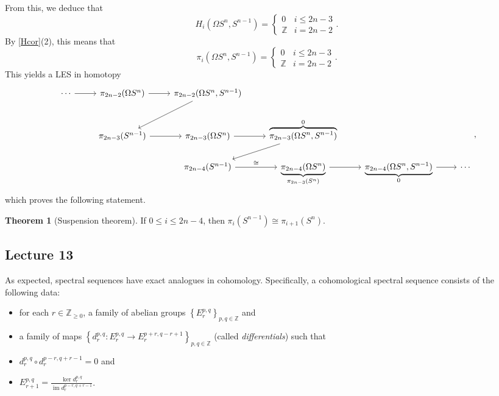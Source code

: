 \documentclass[10pt,letterpaper,cm]{nupset}
\theoremstyle{definition}
\theoremstyle{theorem}
\newtheorem{theorem}[defn]{Theorem}
\theoremstyle{remark}
\newcommand{\Z}{\mathbb Z}
\newcommand{\1}{\mathbb{1}}
\newcommand{\0}{\vec 0}
\DeclareMathOperator{\im}{im}
\newcommand{\bi}{\begin{itemize}}
\newcommand{\ei}{\end{itemize}}
\begin{document}
From this, we deduce that
\[
H_i(\Omega{S^n}, S^{n-1}) = \begin{cases} 0 & i \leq 2n-3
\\ \Z & i = 2n-2
\end{cases}.
\] By \cref{Hcor}(2), this means that
\[
\pi_i(\Omega{S^n}, S^{n-1}) = \begin{cases} 0 & i \leq 2n-3
\\ \Z & i = 2n-2
\end{cases}.
\]
This yields a LES in homotopy
\[
\begin{tikzcd}
\cdots \arrow[r] & \pi_{2n-2}(\Omega{S^n}) \arrow[r] & {\pi_{2n-2}(\Omega{S^n}, S^{n-1})} \arrow[ld] &                                                                  &                                                               &        \\
                 & \pi_{2n-3}(S^{n-1}) \arrow[r]     & \pi_{2n-3}(\Omega{S^n}) \arrow[r]             & {\overbrace{\pi_{2n-3}(\Omega{S^n}, S^{n-1})}^{0}} \arrow[ld]    &                                                               &        \\
                 &                                   & \pi_{2n-4}(S^{n-1}) \arrow[r, "\cong"]        & \underbrace{\pi_{2n-4}(\Omega{S^n})}_{\pi_{2n-3}(S^n)} \arrow[r] & {\underbrace{\pi_{2n-4}(\Omega{S^n}, S^{n-1})}_{0}} \arrow[r] & \cdots
\end{tikzcd},
\] which proves the following statement.

\begin{theorem}[Suspension theorem]
If $0\leq i\leq 2n-4$, then $\pi_i(S^{n-1}) \cong \pi_{i+1}(S^n)$.
\end{theorem}

\subsection{Lecture 13}

As expected, spectral sequences have exact analogues in cohomology. Specifically, a cohomological spectral sequence consists of the following data: 
\bi
\item for each $r\in \Z_{\geq 0}$, a family of abelian groups $\left\{E_r^{p,q}\right\}_{p,q\in \Z}$ and
\item a family of maps  $\left\{d_r^{p,q} : E_r^{p,q} \to E_r^{p+r, q-r+1}\right\}_{p,q\in \Z}$ (called \textit{differentials})  such that
\item $d_r^{p,q} \circ d_r^{p-r, q+r-1} =0$ and
\item $E_{r+1}^{p,q} = \frac{\ker{d_r^{p,q}}}{\im{d_r^{p-r, q+r-1}}}$.
\ei
\end{document}
